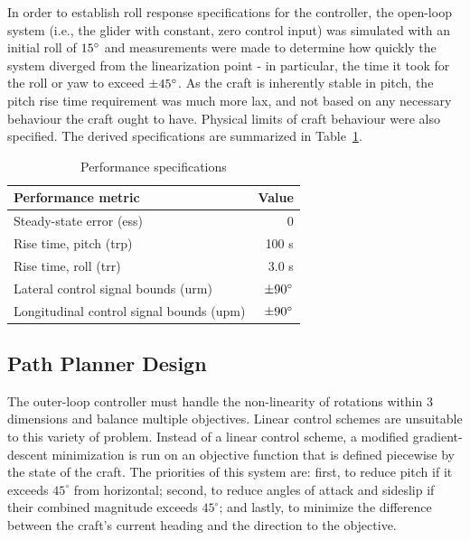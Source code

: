 \documentclass{sydeStyle}
\begin{document}
In order to establish roll response specifications for the controller, the
open-loop system (i.e., the glider with constant, zero control input) was
simulated with an initial roll of $15^\circ$ and measurements were made to
determine how quickly the system diverged from the linearization point - in
particular, the time it took for the roll or yaw to exceed $\pm45^\circ$.  As
the craft is inherently stable in pitch, the pitch rise time requirement was
much more lax, and not based on any necessary behaviour the craft ought to have.
Physical limits of craft behaviour were also specified.  The derived
specifications are summarized in Table~\ref{tab:specs}.


\begin{table}[b]
    \centering
    \begin{tabular}{|l|r|}
        \hline
        Performance metric & Value \\ \hline
        Steady-state error (\gls{ess}) & 0 \\
        Rise time, pitch (\gls{trp}) & 100 s \\
        Rise time, roll (\gls{trr}) & 3.0 s \\
        Lateral control signal bounds (\gls{urm}) & $\pm90^\circ$ \\
        Longitudinal control signal bounds (\gls{upm}) & $\pm90^\circ$ \\
        \hline
    \end{tabular}
    \caption{Performance specifications}
    \label{tab:specs}
\end{table}

\subsection{Path Planner Design}
\label{sec:ppdesign}
The outer-loop controller must handle the non-linearity of rotations within 3
dimensions and balance multiple objectives. Linear control schemes are
unsuitable to this variety of problem. Instead of a linear control scheme, a
modified gradient-descent minimization is run on an objective function that is
defined piecewise by the state of the craft. The priorities of this system are:
first, to reduce pitch if it exceeds $45^{\circ}$ from horizontal; second,
to reduce angles of attack and sideslip if their combined magnitude exceeds
$45^{\circ}$; and lastly, to minimize the difference between the craft's current
heading and the direction to the objective.
\end{document}
